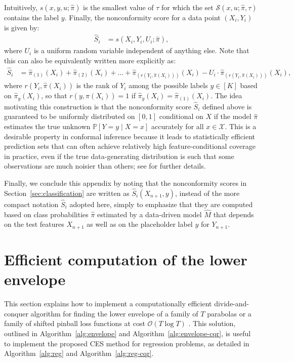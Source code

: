 Intuitively, $s(x,y,u;\hat{\pi})$ is the smallest value of $\tau$ for which the set $\mathcal{S}(x, u ; \hat{\pi}, \tau)$ contains the label $y$.
Finally, the nonconformity score for a data point $(X_i,Y_i)$ is given by:
\begin{align}
  \hat{S}_i
  & = s(X_i,Y_i,U_i;\hat{\pi}),
\end{align}
where $U_i$ is a uniform random variable independent of anything else. Note that this can also be equivalently written more explicitly as:
\begin{align}
  \hat{S}_i
  & = \hat{\pi}_{(1)}(X_i) + \hat{\pi}_{(2)}(X_i) + \ldots + \hat{\pi}_{(r(Y_i,\hat{\pi}(X_i)))}(X_i) - U_i\cdot \hat{\pi}_{(r(Y_i,\hat{\pi}(X_i)))}(X_i),
\end{align}
where $r(Y_i,\hat{\pi}(X_i))$ is the rank of $Y_i$ among the possible labels $y \in [K]$ based on $\hat{\pi}_y(X_i)$, so that $r(y,\hat{\pi}(X_i))=1$ if $\hat{\pi}_{y}(X_i) = \hat{\pi}_{(1)}(X_i)$.
The idea motivating this construction is that the nonconformity score $\hat{S}_i$ defined above is guaranteed to be uniformly distributed on $[0,1]$ conditional on $X$ if the model $\hat{\pi}$ estimates the true unknown $\mathbb{P}[ Y = y \mid X =x]$ accurately for all $x \in \mathcal{X}$.
This is a desirable property in conformal inference because it leads to statistically efficient prediction sets that can often achieve relatively high feature-conditional coverage in practice, even if the true data-generating distribution is such that some observations are much noisier than others; see \citet{romano2020classification} for further details.

Finally, we conclude this appendix by noting that the nonconformity scores in  Section~\ref{sec:classification} are written as $\hat{S}_i(X_{n+1},y)$, instead of the more compact notation $\hat{S}_i$ adopted here, simply to emphasize that they are computed based on class probabilities $\hat{\pi}$ estimated by a data-driven model $\hat{M}$ that depends on the test features $X_{n+1}$ as well as on the placeholder label $y$ for $Y_{n+1}$.

\section{Efficient computation of the lower envelope} \label{app:lower-envelope}

This section explains how to implement a computationally efficient divide-and-conquer algorithm for finding the lower envelope of a family of $T$ parabolas or a family of shifted pinball loss functions at cost $\mathcal{O}(T \log T)$ \cite{devillers1995incremental,nielsen1998output}.
This solution, outlined in Algorithm~\ref{alg:envelope} and Algorithm~\ref{alg:envelope-cqr}, is useful to implement the proposed CES method for regression problems, as detailed in Algorithm~\ref{alg:reg} and Algorithm~\ref{alg:reg-cqr}.

